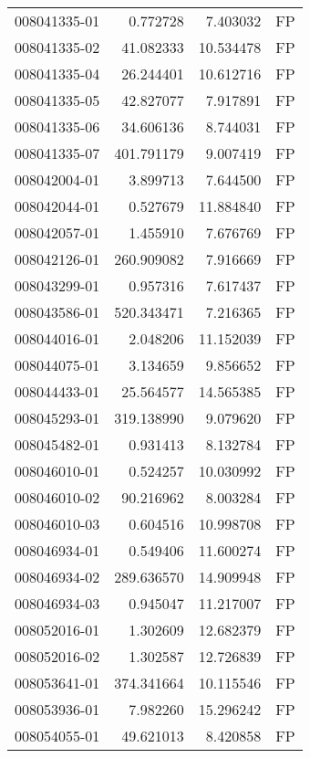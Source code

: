 \begin{tabular}{lrrl}
008041335-01 &    0.772728 &       7.403032 &   FP \\
008041335-02 &   41.082333 &      10.534478 &   FP \\
008041335-04 &   26.244401 &      10.612716 &   FP \\
008041335-05 &   42.827077 &       7.917891 &   FP \\
008041335-06 &   34.606136 &       8.744031 &   FP \\
008041335-07 &  401.791179 &       9.007419 &   FP \\
008042004-01 &    3.899713 &       7.644500 &   FP \\
008042044-01 &    0.527679 &      11.884840 &   FP \\
008042057-01 &    1.455910 &       7.676769 &   FP \\
008042126-01 &  260.909082 &       7.916669 &   FP \\
008043299-01 &    0.957316 &       7.617437 &   FP \\
008043586-01 &  520.343471 &       7.216365 &   FP \\
008044016-01 &    2.048206 &      11.152039 &   FP \\
008044075-01 &    3.134659 &       9.856652 &   FP \\
008044433-01 &   25.564577 &      14.565385 &   FP \\
008045293-01 &  319.138990 &       9.079620 &   FP \\
008045482-01 &    0.931413 &       8.132784 &   FP \\
008046010-01 &    0.524257 &      10.030992 &   FP \\
008046010-02 &   90.216962 &       8.003284 &   FP \\
008046010-03 &    0.604516 &      10.998708 &   FP \\
008046934-01 &    0.549406 &      11.600274 &   FP \\
008046934-02 &  289.636570 &      14.909948 &   FP \\
008046934-03 &    0.945047 &      11.217007 &   FP \\
008052016-01 &    1.302609 &      12.682379 &   FP \\
008052016-02 &    1.302587 &      12.726839 &   FP \\
008053641-01 &  374.341664 &      10.115546 &   FP \\
008053936-01 &    7.982260 &      15.296242 &   FP \\
008054055-01 &   49.621013 &       8.420858 &   FP \\

\end{tabular}
